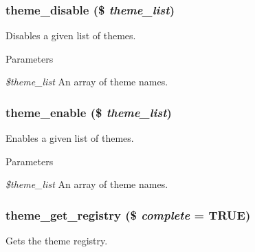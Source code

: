 \hypertarget{includes_2theme_8inc_a03fbdb816d1b0a97b0e65291831c0cdb}{
\subsubsection[{theme\_\-disable}]{\setlength{\rightskip}{0pt plus 5cm}theme\_\-disable (\$ {\em theme\_\-list})}}
\label{includes_2theme_8inc_a03fbdb816d1b0a97b0e65291831c0cdb}
Disables a given list of themes.


\begin{DoxyParams}{Parameters}
\item[{\em \$theme\_\-list}]An array of theme names. \end{DoxyParams}
\hypertarget{includes_2theme_8inc_a145f4abe8c30a0c1bc012ce634448c79}{
\subsubsection[{theme\_\-enable}]{\setlength{\rightskip}{0pt plus 5cm}theme\_\-enable (\$ {\em theme\_\-list})}}
\label{includes_2theme_8inc_a145f4abe8c30a0c1bc012ce634448c79}
Enables a given list of themes.


\begin{DoxyParams}{Parameters}
\item[{\em \$theme\_\-list}]An array of theme names. \end{DoxyParams}
\hypertarget{includes_2theme_8inc_ae532c57b7a0288c1a359da1e2a70a0b1}{
\subsubsection[{theme\_\-get\_\-registry}]{\setlength{\rightskip}{0pt plus 5cm}theme\_\-get\_\-registry (\$ {\em complete} = {\ttfamily TRUE})}}
\label{includes_2theme_8inc_ae532c57b7a0288c1a359da1e2a70a0b1}
Gets the theme registry.


